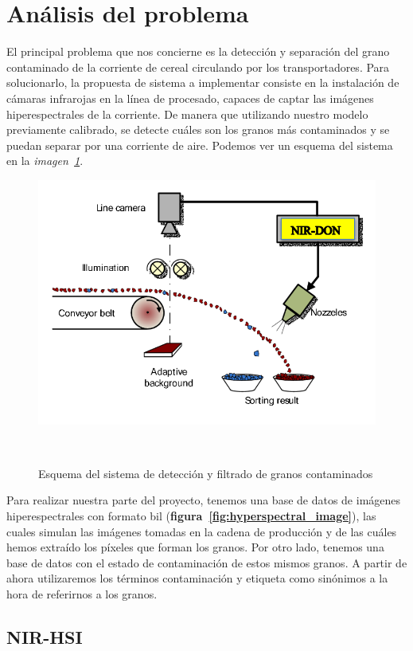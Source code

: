 \section{Análisis del problema}

El principal problema que nos concierne es la detección y separación del grano contaminado de la corriente de cereal circulando por los transportadores. Para solucionarlo,
la propuesta de sistema a implementar consiste en la instalación de cámaras infrarojas en la línea de procesado, capaces de captar las imágenes hiperespectrales de la
corriente. De manera que utilizando nuestro modelo previamente calibrado, se detecte cuáles son los granos más contaminados y se puedan separar por una corriente de aire. 
Podemos ver un esquema del sistema en la \textit{imagen\ \ref{fig:detection-system}}.

\begin{figure}
    \centering
    \includegraphics[width=0.7\linewidth]{media/images/esquema-del-sistema.png}
    \caption{Esquema del sistema de detección y filtrado de granos contaminados}\ \label{fig:detection-system}
\end{figure}

Para realizar nuestra parte del proyecto, tenemos una base de datos de imágenes hiperespectrales con formato \acrshort{bil} (\textbf{figura\ \ref{fig:hyperspectral_image}}), 
las cuales simulan las imágenes tomadas en la cadena de producción y de las cuáles hemos extraído los píxeles que forman los granos.
Por otro lado, tenemos una base de datos con el estado de contaminación de estos mismos granos. A partir de ahora utilizaremos los términos contaminación y etiqueta como 
sinónimos a la hora de referirnos a los granos.


\subsection{NIR-HSI}

